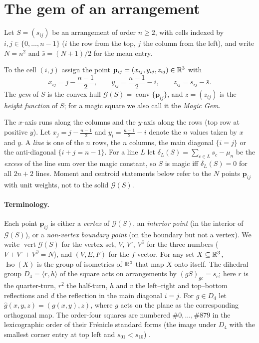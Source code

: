 \section{The gem of an arrangement}
\label{sec:gem}

Let $S=(s_{ij})$ be an arrangement of order $n\ge2$, with cells indexed by $i,j\in\{0,\dots,n-1\}$ ($i$ the row from the top, $j$ the column from the left), and write $N=n^2$ and $\bar s=(N+1)/2$ for the mean entry.

\begin{definition}
\label{def:gem_coords}
To the cell $(i,j)$ assign the point $\mathbf p_{ij}=(x_{ij},y_{ij},z_{ij})\in\mathbb{R}^3$ with
\begin{equation}
x_{ij}=j-\frac{n-1}{2},\qquad y_{ij}=\frac{n-1}{2}-i,\qquad z_{ij}=s_{ij}-\bar s.
\label{eq:gem_coords}
\end{equation}
The \emph{gem} of $S$ is the convex hull $\mathcal G(S)=\operatorname{conv}\{\mathbf p_{ij}\}$, and $z=(z_{ij})$ is the \emph{height function} of $S$; for a magic square we also call it the \emph{Magic Gem}.
\end{definition}

The $x$-axis runs along the columns and the $y$-axis along the rows (top row at positive $y$).
Let $x_j=j-\frac{n-1}2$ and $y_i=\frac{n-1}2-i$ denote the $n$ values taken by $x$ and $y$.
A \emph{line} is one of the $n$ rows, the $n$ columns, the main diagonal $\{i=j\}$ or the anti-diagonal $\{i+j=n-1\}$.
For a line $L$ let $\delta_L(S)=\sum_{c\in L}s_c-\mu_n$ be the \emph{excess} of the line sum over the magic constant, so $S$ is magic iff $\delta_L(S)=0$ for all $2n+2$ lines.
Moment and centroid statements below refer to the $N$ points $\mathbf p_{ij}$ with unit weights, not to the solid $\mathcal G(S)$.

\paragraph{Terminology.}
Each point $\mathbf p_{ij}$ is either a \emph{vertex} of $\mathcal G(S)$, an \emph{interior point} (in the interior of $\mathcal G(S)$), or a \emph{non-vertex boundary point} (on the boundary but not a vertex).
We write $\operatorname{vert}\mathcal G(S)$ for the vertex set, $V$, $V^\circ$, $V^\partial$ for the three numbers ($V+V^\circ+V^\partial=N$), and $(V,E,F)$ for the $f$-vector.
For any set $X\subseteq\mathbb{R}^3$, $\operatorname{Iso}(X)$ is the group of isometries of $\mathbb{R}^3$ that map $X$ onto itself.
The dihedral group $D_4=\langle r,h\rangle$ of the square acts on arrangements by $(gS)_{gc}=s_c$; here $r$ is the quarter-turn, $r^2$ the half-turn, $h$ and $v$ the left--right and top--bottom reflections and $d$ the reflection in the main diagonal $i=j$.
For $g\in D_4$ let $\hat g(x,y,z)=(g(x,y),z)$, where $g$ acts on the plane as the corresponding orthogonal map.
The order-four squares are numbered $\#0,\dots,\#879$ in the lexicographic order of their Fr\'enicle standard forms (the image under $D_4$ with the smallest corner entry at top left and $s_{01}<s_{10}$) \cite{frenicle1693}.

